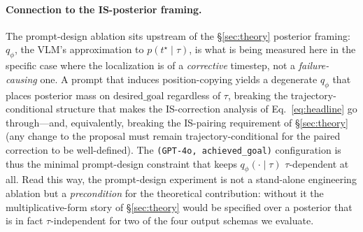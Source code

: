 \documentclass{article}
\begin{document}
\paragraph{Connection to the IS-posterior framing.}
The prompt-design ablation sits upstream of the \S\ref{sec:theory}
posterior framing: $q_\phi$, the VLM's approximation to
$p(t^\star\!\mid\!\tau)$, is what is being measured here in the
specific case where the localization is of a \emph{corrective} timestep,
not a \emph{failure-causing} one. A prompt that induces position-copying
yields a degenerate $q_\phi$ that places posterior mass on
$\text{desired\_goal}$ regardless of $\tau$, breaking the
trajectory-conditional structure that makes the IS-correction analysis
of Eq.~\eqref{eq:headline} go through---and, equivalently, breaking the
IS-pairing requirement of \S\ref{sec:theory} (any change to the proposal
must remain trajectory-conditional for the paired correction to be
well-defined). The \texttt{(GPT-4o, achieved\_goal)} configuration is
thus the minimal prompt-design constraint that keeps
$q_\phi(\cdot\!\mid\!\tau)$ $\tau$-dependent at all. Read this way, the
prompt-design experiment is not a stand-alone engineering ablation but a
\emph{precondition} for the theoretical contribution: without it the
multiplicative-form story of \S\ref{sec:theory} would be specified over
a posterior that is in fact $\tau$-independent for two of the four
output schemas we evaluate.
\end{document}

